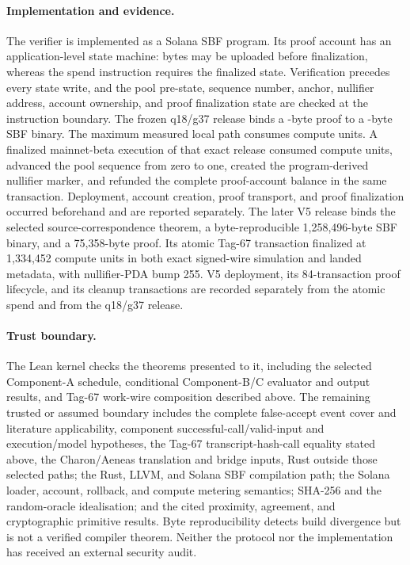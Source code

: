 \paragraph{Implementation and evidence.}
The verifier is implemented as a Solana SBF program.  Its proof account has an
application-level state machine: bytes may be uploaded before finalization,
whereas the spend instruction requires the finalized state.  Verification
precedes every state write, and the pool pre-state, sequence number, anchor,
nullifier address, account ownership, and proof finalization state are checked
at the instruction boundary.  The frozen q18/g37 release binds a
\ProfileProofBytes-byte proof to a \ProfileSbfBytes-byte SBF binary.  The
maximum measured local path consumes \ProfileComputeUnits{} compute units.  A
finalized mainnet-beta execution of that exact release consumed
\ProfileMainnetComputeUnits{} compute units, advanced the pool sequence from
zero to one, created the program-derived nullifier marker, and refunded the complete
proof-account balance in the same transaction.  Deployment, account creation,
proof transport, and proof finalization occurred beforehand and are reported
separately.  The later V5 release binds the selected source-correspondence
theorem, a byte-reproducible 1,258,496-byte SBF binary, and a 75,358-byte
proof.  Its atomic Tag-67 transaction finalized at 1,334,452 compute units in
both exact signed-wire simulation and landed metadata, with nullifier-PDA bump
255.  V5 deployment, its 84-transaction proof lifecycle,
and its cleanup transactions are recorded separately from the atomic spend
and from the q18/g37 release.

\paragraph{Trust boundary.}
The Lean kernel checks the theorems presented to it, including the selected
Component-A schedule, conditional Component-B/C evaluator and output results,
and Tag-67 work-wire composition described above.  The remaining trusted or
assumed boundary includes the complete false-accept event cover and literature
applicability, component successful-call/valid-input and execution/model
hypotheses, the Tag-67 transcript-hash-call equality stated above, the
Charon/Aeneas translation and bridge inputs, Rust outside those selected paths;
the Rust, LLVM, and Solana SBF compilation path; the Solana loader, account,
rollback, and compute metering semantics; SHA-256 and the random-oracle
idealisation; and the cited
proximity, agreement, and cryptographic primitive results.  Byte reproducibility
detects build divergence but is not a verified compiler theorem.  Neither the
protocol nor the implementation has received an external security audit.

